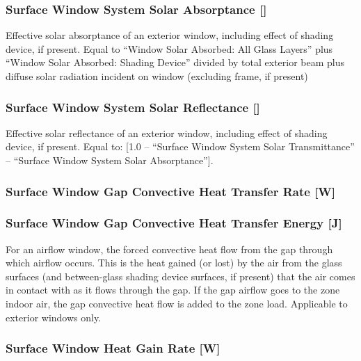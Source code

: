 \subsubsection{Surface Window System Solar Absorptance {[]}}\label{surface-window-system-solar-absorptance}

Effective solar absorptance of an exterior window, including effect of shading device, if present. Equal to ``Window Solar Absorbed: All Glass Layers'' plus ``Window Solar Absorbed: Shading Device'' divided by total exterior beam plus diffuse solar radiation incident on window (excluding frame, if present)

\subsubsection{Surface Window System Solar Reflectance {[]}}\label{surface-window-system-solar-reflectance}

Effective solar reflectance of an exterior window, including effect of shading device, if present. Equal to: {[}1.0 -- ``Surface Window System Solar Transmittance'' -- ``Surface Window System Solar Absorptance''{]}.

\subsubsection{Surface Window Gap Convective Heat Transfer Rate {[}W{]}}\label{surface-window-gap-convective-heat-transfer-rate-w}

\subsubsection{Surface Window Gap Convective Heat Transfer Energy {[}J{]}}\label{surface-window-gap-convective-heat-transfer-energy-j}

For an airflow window, the forced convective heat flow from the gap through which airflow occurs. This is the heat gained (or lost) by the air from the glass surfaces (and between-glass shading device surfaces, if present) that the air comes in contact with as it flows through the gap. If the gap airflow goes to the zone indoor air, the gap convective heat flow is added to the zone load. Applicable to exterior windows only.

\subsubsection{Surface Window Heat Gain Rate {[}W{]}}\label{surface-window-heat-gain-rate-w}

